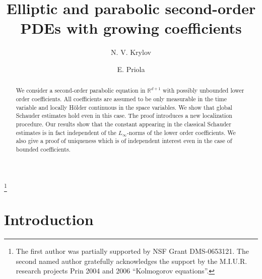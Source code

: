 \documentclass[reqno,12pt]{amsart}
\theoremstyle{definition}
\theoremstyle{remark}
\begin{document}
\title[PDEs with growing coefficients]
{Elliptic and parabolic second-order PDEs with growing coefficients}

\author{N. V. Krylov}
\address{127 Vincent Hall \\ University of Minnesota,
Minneapolis, MN 55455  USA} 

\author{E. Priola}
\address{Dipartimento di Matematica\\Universit\`a di Torino
\\Via Carlo Alberto
10\\10123 Torino\\Italy } 

\date{}

\thanks{The first author was partially supported by
NSF Grant DMS-0653121. The second named author gratefully
acknowledges the support by the  M.I.U.R. research projects Prin
2004 and 2006 ``Kolmogorov equations''.}



\begin{abstract} We consider a second-order parabolic equation in
${\mathbb{R}}^{d+1}$ with  possibly unbounded lower order coefficients. All
coefficients are
   assumed
to be  only  measurable   in the time variable
    and locally
H\"older continuous in the space variables.
   We show that   global  Schauder
   estimates  hold even in this case. The proof introduces
    a new localization procedure.
  Our  results  show that the constant appearing
  in the classical
 Schauder estimates is
  in fact   independent of the $L_{\infty}$-norms of the lower order
  coefficients.  
     We also give a proof of   uniqueness
      which is of independent interest
     even in the case  of bounded coefficients.

\end{abstract}

\maketitle

 

{\section{{Introduction}}
\setcounter{equation}{0}}
\end{document}
